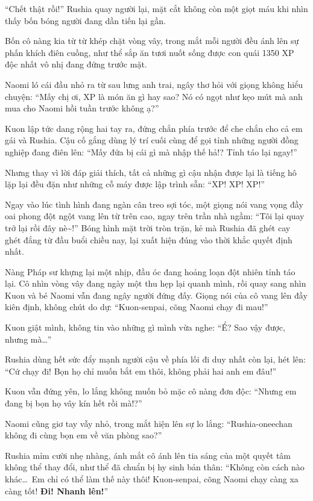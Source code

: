 \documentclass[../main.tex]{subfiles}
\begin{document}
``Chết thật rồi!'' Rushia quay người lại, mặt cắt không còn một giọt máu khi nhìn thấy bốn bóng người đang dần tiến lại gần.

Bốn cô nàng kia từ từ khép chặt vòng vây, trong mắt mỗi người đều ánh lên sự phấn khích điên cuồng, như thể sắp ăn tươi nuốt sống được con quái 1350 XP độc nhất vô nhị đang đứng trước mặt.


Naomi ló cái đầu nhỏ ra từ sau lưng anh trai, ngây thơ hỏi với giọng không hiểu chuyện: ``Mấy chị ơi, XP là món ăn gì hay sao? Nó có ngọt như kẹo mút mà anh mua cho Naomi hồi tuần trước không ạ?''

Kuon lập tức dang rộng hai tay ra, đứng chắn phía trước để che chắn cho cả em gái và Rushia. Cậu cố gắng dùng lý trí cuối cùng để gọi tỉnh những người đồng nghiệp đang điên lên: ``Mấy đứa bị cái gì mà nhập thế hả!? Tỉnh táo lại ngay!''

Nhưng thay vì lời đáp giải thích, tất cả những gì cậu nhận được lại là tiếng hô lặp lại đều đặn như những cỗ máy được lập trình sẵn: ``XP! XP! XP!''

Ngay vào lúc tình hình đang ngàn cân treo sợi tóc, một giọng nói vang vọng đầy oai phong đột ngột vang lên từ trên cao, ngay trên trần nhà ngầm: ``Tôi lại quay trở lại rồi đây nè\~{}!'' Bóng hình mặt trời tròn trặn, kẻ mà Rushia đã ghét cay ghét đắng từ đầu buổi chiều nay, lại xuất hiện đúng vào thời khắc quyết định nhất.

Nàng Pháp sư khựng lại một nhịp, đầu óc đang hoảng loạn đột nhiên tỉnh táo lại. Cô nhìn vòng vây đang ngày một thu hẹp lại quanh mình, rồi quay sang nhìn Kuon và bé Naomi vẫn đang ngây người đứng đấy. Giọng nói của cô vang lên đầy kiên định, không chút do dự: ``Kuon-senpai, cõng Naomi chạy đi mau!''

Kuon giật mình, không tin vào những gì mình vừa nghe: ``Ể? Sao vậy được, nhưng mà\dots''

Rushia dùng hết sức đẩy mạnh người cậu về phía lối đi duy nhất còn lại, hét lên: ``Cứ chạy đi! Bọn họ chỉ muốn bắt em thôi, không phải hai anh em đâu!''

Kuon vẫn đứng yên, lo lắng không muốn bỏ mặc cô nàng đơn độc: ``Nhưng em đang bị bọn họ vây kín hết rồi mà!?''

Naomi cũng giơ tay vẫy nhỏ, trong mắt hiện lên sự lo lắng: ``Rushia-oneechan không đi cùng bọn em về văn phòng sao?''

Rushia mỉm cười nhẹ nhàng, ánh mắt cô ánh lên tia sáng của một quyết tâm không thể thay đổi, như thể đã chuẩn bị hy sinh bản thân: ``Không còn cách nào khác\dots\ Em chỉ có thể làm thế này thôi! Kuon-senpai, cõng Naomi chạy càng xa càng tốt! \textbf{Đi! Nhanh lên!}''
\end{document}
